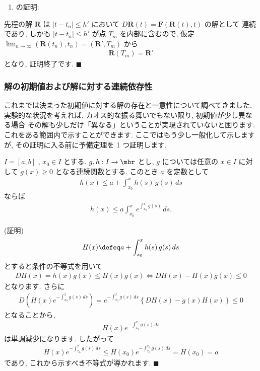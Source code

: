 \documentclass[openany, a4paper, oneside]{jsbook}
\begin{document}
\begin{enumerate}
\item の証明:
\end{enumerate}
先程の解 $\bm{R}$ は $| t - t_n | \leq h'$
において $D \bm{R} (t) = \bm{F} ( \bm{R}(t) , t )$ の解として
連続であり, しかも $| t - t_n | \leq h'$ が点 $T_m$ を内部に含むので,
仮定 $\lim_{n \to \infty} ( \bm{R}(t_n) , t_n  ) = ( \bm{R}' , T_m )$ から
\begin{gather}
\bm{R}(T_m)
=
\bm{R}'
\end{gather}
となり, 証明終了です.  $\blacksquare$
\subsubsection{解の初期値および解に対する連続依存性}

これまでは決まった初期値に対する解の存在と一意性について調べてきました.
実験的な状況を考えれば, カオス的な振る舞いでもない限り, 初期値が少し異なる場合
その解も少しだけ「異なる」ということが実現されていないと困ります.
これをある範囲内で示すことができます.
ここではもう少し一般化して示しますが,
その証明に入る前に予備定理を 1 つ証明します.
\begin{thm}[Gronwall]
$I = [a , b]$ ,  $x_0 \in I$ とする.
$g ,h : I \to \mbr$ とし,  $g$ については任意の $x \in I$ に対して $g (x) \geq 0$ となる連続関数とする.
このとき $a$ を定数として
\begin{gather}
h (x)
\leq
a + \int_{x_0}^x h (s) \, g (s) \, ds
\end{gather}
ならば
\begin{gather}
h (x)
\leq
a \int_{x_0}^x e^{ \int_{x_0}^x g ( s ) } \, ds .
\end{gather}
\end{thm}
(証明)
\begin{gather}
H (x)
\defeq
a + \int_{x_0}^x h (s) \, g (s) \, ds
\end{gather}
とすると条件の不等式を用いて
\begin{gather}
DH (x)
=
h (x) g (x)
\leq
H (x) g (x)
\Longleftrightarrow
DH (x) - H (x) g (x) \leq 0
\end{gather}
となります.
さらに
\begin{gather}
D \left ( H (x) e^{ - \int_{x_0}^x g ( s ) \, ds } \right)
=
e^{ -\int_{x_0}^x g ( s ) \, ds} \left\{ DH (x) - g (x) H (x)  \right\}
\leq
0
\end{gather}
となることから,
\begin{gather}
H (x) e^{ - \int_{x_0}^x g ( s ) \, ds }
\end{gather}
は単調減少になります.
したがって
\begin{gather}
H (x) e^{ - \int_{x_0}^x g ( s ) \, ds }
\leq
H (x_0) e^{ - \int_{x_0}^{x_0} g ( s ) \, ds }
=
H (x_0)
=
a
\end{gather}
であり, これから示すべき不等式が導かれます.  $\blacksquare$
\end{document}
